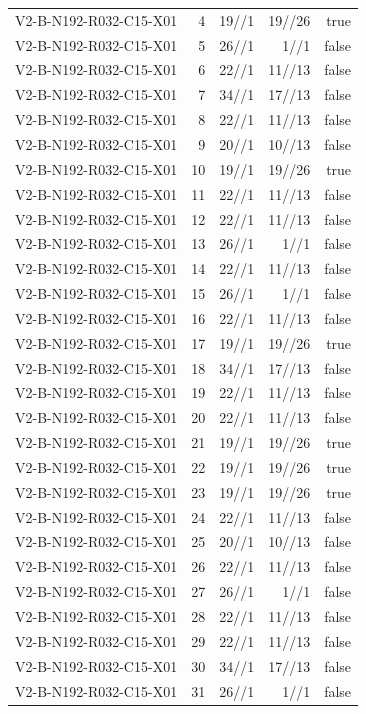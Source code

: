 {\begin{longtable}{lrrrr}
V2-B-N192-R032-C15-X01 & 4 & 19//1 & 19//26 & true \\
V2-B-N192-R032-C15-X01 & 5 & 26//1 & 1//1 & false \\
V2-B-N192-R032-C15-X01 & 6 & 22//1 & 11//13 & false \\
V2-B-N192-R032-C15-X01 & 7 & 34//1 & 17//13 & false \\
V2-B-N192-R032-C15-X01 & 8 & 22//1 & 11//13 & false \\
V2-B-N192-R032-C15-X01 & 9 & 20//1 & 10//13 & false \\
V2-B-N192-R032-C15-X01 & 10 & 19//1 & 19//26 & true \\
V2-B-N192-R032-C15-X01 & 11 & 22//1 & 11//13 & false \\
V2-B-N192-R032-C15-X01 & 12 & 22//1 & 11//13 & false \\
V2-B-N192-R032-C15-X01 & 13 & 26//1 & 1//1 & false \\
V2-B-N192-R032-C15-X01 & 14 & 22//1 & 11//13 & false \\
V2-B-N192-R032-C15-X01 & 15 & 26//1 & 1//1 & false \\
V2-B-N192-R032-C15-X01 & 16 & 22//1 & 11//13 & false \\
V2-B-N192-R032-C15-X01 & 17 & 19//1 & 19//26 & true \\
V2-B-N192-R032-C15-X01 & 18 & 34//1 & 17//13 & false \\
V2-B-N192-R032-C15-X01 & 19 & 22//1 & 11//13 & false \\
V2-B-N192-R032-C15-X01 & 20 & 22//1 & 11//13 & false \\
V2-B-N192-R032-C15-X01 & 21 & 19//1 & 19//26 & true \\
V2-B-N192-R032-C15-X01 & 22 & 19//1 & 19//26 & true \\
V2-B-N192-R032-C15-X01 & 23 & 19//1 & 19//26 & true \\
V2-B-N192-R032-C15-X01 & 24 & 22//1 & 11//13 & false \\
V2-B-N192-R032-C15-X01 & 25 & 20//1 & 10//13 & false \\
V2-B-N192-R032-C15-X01 & 26 & 22//1 & 11//13 & false \\
V2-B-N192-R032-C15-X01 & 27 & 26//1 & 1//1 & false \\
V2-B-N192-R032-C15-X01 & 28 & 22//1 & 11//13 & false \\
V2-B-N192-R032-C15-X01 & 29 & 22//1 & 11//13 & false \\
V2-B-N192-R032-C15-X01 & 30 & 34//1 & 17//13 & false \\
V2-B-N192-R032-C15-X01 & 31 & 26//1 & 1//1 & false \\

\end{longtable}}
